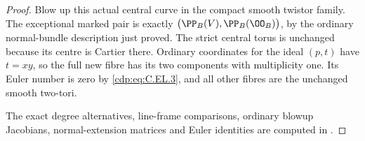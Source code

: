 \begin{proof}
Blow up this actual central curve in the compact smooth
twistor family. The exceptional marked pair is exactly
$\bigl(\PP_B(V),\PP_B(\OO_B)\bigr)$, by the ordinary
normal-bundle description just proved. The strict central
torus is unchanged because its centre is Cartier there.
Ordinary coordinates for the ideal $(p,t)$ have $t=xy$,
so the full new fibre has its two components with
multiplicity one. Its Euler number is zero by \eqref{cdp:eq:C.EL.3},
and all other fibres are the unchanged smooth two-tori.

The exact degree alternatives, line-frame comparisons,
ordinary blowup Jacobians, normal-extension matrices and
Euler identities are computed in
.
\end{proof}


